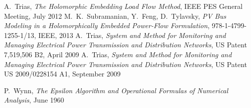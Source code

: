 \documentclass[12pt,a4paper]{article}
\begin{document}
	\begin{thebibliography}{1}
			A.~Trias, \emph{The Holomorphic Embedding Load Flow Method}, IEEE PES General Meeting, July 2012
			M.~K.~Subramanian, Y.~Feng, D.~Tylavsky, \emph{PV Bus Modeling in a Holomorphically Embedded Power-Flow Formulation}, 978-1-4799-1255-1/13, IEEE, 2013
			A.~Trias, \emph{System and Method for Monitoring and Managing Electrical Power Transmission and Distribution Networks}, US Patent 7,519,506 B2, April 2009
			A.~Trias, \emph{System and Method for Monitoring and Managing Electrical Power Transmission and Distribution Networks}, US Patent US 2009/0228154 A1, September 2009
			
			P.~Wynn, \emph{The Epsilon Algorithm and Operational Formulas of Numerical Analysis}, June 1960

	\end{thebibliography}
\end{document}
